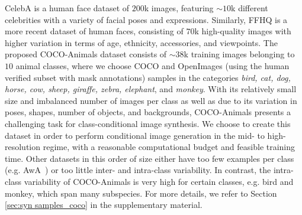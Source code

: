 \documentclass[10pt,twocolumn,letterpaper]{article}
\begin{document}
CelebA is a human face dataset of $200$\unit{k} images, featuring $\sim10$\unit{k} different celebrities with a variety of facial poses and expressions. Similarly, FFHQ is a more recent dataset of human faces, consisting of $70$\unit{k} high-quality images with higher variation in terms of age, ethnicity, accessories, and viewpoints. 
The proposed COCO-Animals dataset consists of $\sim 38$\unit{k} training images belonging to $10$ animal classes, where 
we choose COCO and OpenImages (using the human verified subset with mask annotations) samples in the categories \textit{bird, cat, dog, horse, cow, sheep, giraffe, zebra, elephant}, and \textit{monkey}.  With its relatively small size and imbalanced number of images per class as well as due to its variation in poses, shapes, number of objects, and backgrounds, COCO-Animals presents a challenging task for class-conditional image synthesis.
We choose to create this dataset in order to perform conditional image generation in the mid- to high-resolution regime, with a reasonable computational budget and feasible training time. Other datasets in this order of size either have too few examples per class (e.g. AwA~\cite{Xian2017ZeroShotLC}) or too little inter- and intra-class variability. In contrast, the intra-class variability of COCO-Animals is very high for certain classes, e.g. bird and monkey, which span many subspecies. For more details, we refer to Section \ref{sec:syn samples_coco} in the supplementary material.
\end{document}
